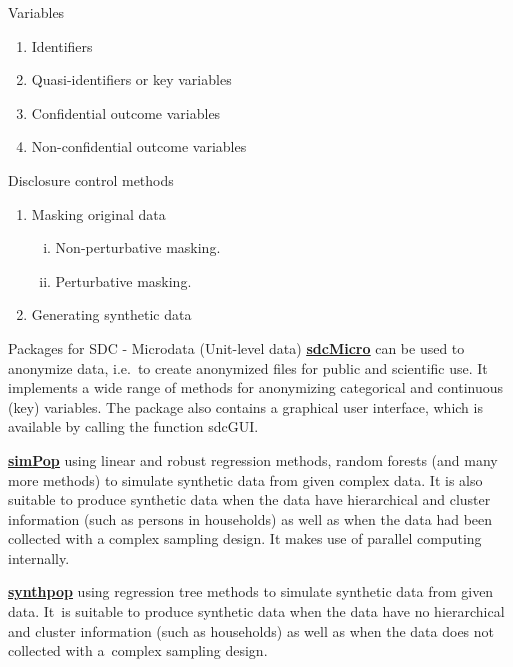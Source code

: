 \documentclass[
  ignorenonframetext,
  aspectratio=169,
]{beamer}
\providecommand{\tightlist}{%
  \setlength{\itemsep}{0pt}\setlength{\parskip}{0pt}}\usepackage{longtable,booktabs,array}
\begin{document}
\begin{frame}{Variables}
\protect\hypertarget{variables}{}
\begin{enumerate}
\tightlist
\item
  Identifiers
\item
  Quasi-identifiers or key variables
\item
  Confidential outcome variables
\item
  Non-confidential outcome variables
\end{enumerate}
\end{frame}

\begin{frame}{Disclosure control methods}
\protect\hypertarget{disclosure-control-methods}{}
\begin{enumerate}
\tightlist
\item
  Masking original data

  \begin{enumerate}
  [i.]
  \tightlist
  \item
    Non-perturbative masking.
  \item
    Perturbative masking.
  \end{enumerate}
\item
  Generating synthetic data
\end{enumerate}
\end{frame}

\begin{frame}{Packages for SDC - Microdata (Unit-level data)}
\protect\hypertarget{packages-for-sdc---microdata-unit-level-data}{}
\href{https://cran.r-project.org/web/packages/sdcMicro/index.html}{\color{blue}\underline{\textbf{sdcMicro}}}
can be used to anonymize data, i.e.~to create anonymized files for
public and scientific use. It implements a wide range of methods for
anonymizing categorical and continuous (key) variables. The package also
contains a graphical user interface, which is available by calling the
function sdcGUI.

\href{https://cran.r-project.org/web/packages/simPop/index.html}{\color{blue}\underline{\textbf{simPop}}}
using linear and robust regression methods, random forests (and many
more methods) to simulate synthetic data from given complex data. It is
also suitable to produce synthetic data when the data have hierarchical
and cluster information (such as persons in households) as well as when
the data had been collected with a complex sampling design. It makes use
of parallel computing internally.

\href{https://cran.r-project.org/web/packages/synthpop/index.html}{\color{blue}\underline{\textbf{synthpop}}}
using regression tree methods to simulate synthetic data from given
data. It~is suitable to produce synthetic data when the data have no
hierarchical and cluster information (such as households) as well as
when the data does not collected with a~complex sampling design.
\end{frame}
\end{document}
